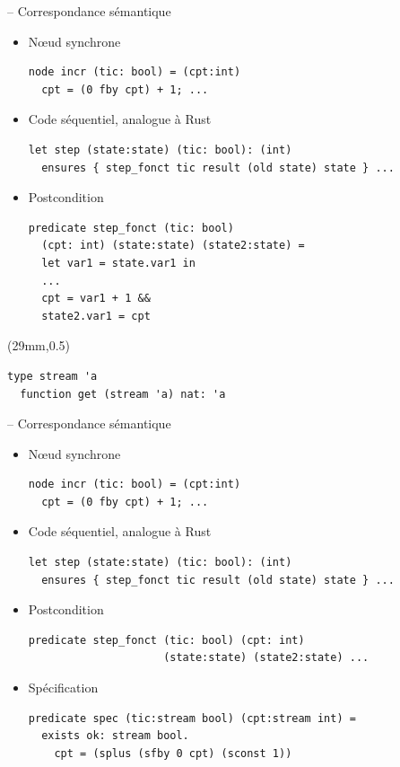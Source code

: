 \documentclass[11pt,usenames,dvipsnames]{beamer}
\begin{document}
\begin{frame}[fragile]{-- Correspondance sémantique}
\begin{itemize}
\item Nœud synchrone
  \begin{lstlisting}[language=minils]
node incr (tic: bool) = (cpt:int)
  cpt = (0 fby cpt) + 1; ...\end{lstlisting}
\item Code séquentiel, analogue à Rust
  \begin{lstlisting}[language=why3]
let step (state:state) (tic: bool): (int)
  ensures { step_fonct tic result (old state) state } ...\end{lstlisting}
\item Postcondition
  \begin{lstlisting}[language=why3]
predicate step_fonct (tic: bool)
  (cpt: int) (state:state) (state2:state) =
  let var1 = state.var1 in
  ...
  cpt = var1 + 1 &&
  state2.var1 = cpt\end{lstlisting}
\end{itemize}


\begin{textblock*}{70mm}(29mm,0.5\textheight)
\begin{exampleblock}{}
  \begin{lstlisting}[language=why3]
  type stream 'a
  function get (stream 'a) nat: 'a
\end{lstlisting}
\end{exampleblock}
\end{textblock*}

\end{frame}

\begin{frame}[fragile]{-- Correspondance sémantique}
\begin{itemize}
\item Nœud synchrone
  \begin{lstlisting}[language=minils]
node incr (tic: bool) = (cpt:int)
  cpt = (0 fby cpt) + 1; ...\end{lstlisting}
\item Code séquentiel, analogue à Rust
  \begin{lstlisting}[language=why3]
let step (state:state) (tic: bool): (int)
  ensures { step_fonct tic result (old state) state } ...\end{lstlisting}
\item Postcondition
  \begin{lstlisting}[language=why3]
predicate step_fonct (tic: bool) (cpt: int)
					 (state:state) (state2:state) ...\end{lstlisting}
\item Spécification
  \begin{lstlisting}[language=why3]
predicate spec (tic:stream bool) (cpt:stream int) =
  exists ok: stream bool.
    cpt = (splus (sfby 0 cpt) (sconst 1))\end{lstlisting}

\end{itemize}
\end{frame}
\end{document}
